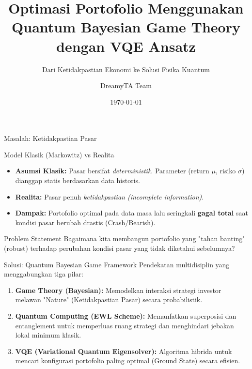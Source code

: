 \documentclass{beamer}
\title[Quantum Bayesian Portfolio]{Optimasi Portofolio Menggunakan Quantum Bayesian Game Theory dengan VQE Ansatz}
\subtitle{Dari Ketidakpastian Ekonomi ke Solusi Fisika Kuantum}
\author{DreamyTA Team}
\date{\today}
\begin{document}

\begin{frame}
    \titlepage
\end{frame}

\begin{frame}{Masalah: Ketidakpastian Pasar}
    \begin{block}{Model Klasik (Markowitz) vs Realita}
        \begin{itemize}
            \item \textbf{Asumsi Klasik:} Pasar bersifat \textit{deterministik}. Parameter (return $\mu$, risiko $\sigma$) dianggap statis berdasarkan data historis.
            \item \textbf{Realita:} Pasar penuh \textit{ketidakpastian (incomplete information)}.
            \item \textbf{Dampak:} Portofolio optimal pada data masa lalu seringkali \textbf{gagal total} saat kondisi pasar berubah drastis (Crash/Bearish).
        \end{itemize}
    \end{block}

    \begin{alertblock}{Problem Statement}
        Bagaimana kita membangun portofolio yang "tahan banting" (robust) terhadap perubahan kondisi pasar yang tidak diketahui sebelumnya?
    \end{alertblock}
\end{frame}

\begin{frame}{Solusi: Quantum Bayesian Game Framework}
    Pendekatan multidisiplin yang menggabungkan tiga pilar:
    
    \begin{enumerate}
        \item \textbf{Game Theory (Bayesian):}
        Memodelkan interaksi strategi investor melawan "Nature" (Ketidakpastian Pasar) secara probabilistik.
        
        \item \textbf{Quantum Computing (EWL Scheme):}
        Memanfatkan superposisi dan entanglement untuk memperluas ruang strategi dan menghindari jebakan lokal minimum klasik.
        
        \item \textbf{VQE (Variational Quantum Eigensolver):}
        Algoritma hibrida untuk mencari konfigurasi portofolio paling optimal (Ground State) secara efisien.
    \end{enumerate}
\end{frame}
\end{document}
